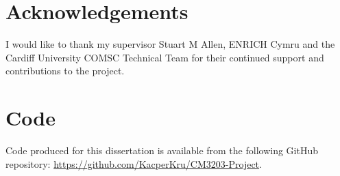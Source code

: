 \chapter{Acknowledgements}
I would like to thank my supervisor Stuart M Allen, ENRICH Cymru and the Cardiff University COMSC Technical Team 
for their continued support and contributions to the project.


\chapter{Code}


Code produced for this dissertation is available from the following GitHub repository:
\url{https://github.com/KacperKru/CM3203-Project}.

